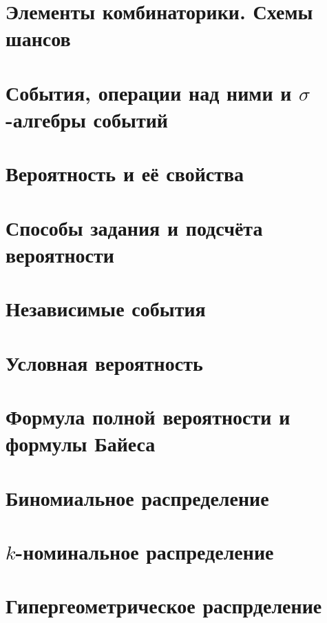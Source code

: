\section{Элементы комбинаторики. Схемы шансов} %


\section{События, операции над ними и $\sigma$-алгебры событий} %


\section{Вероятность и её свойства} %


\section{Способы задания и подсчёта вероятности} %
% 

\section{Независимые события} %
% 

\section{Условная вероятность} %
% 

\section{Формула полной вероятности и формулы Байеса} %
% 

\section{Биномиальное распределение} %


\section{$k$-номинальное распределение}

\section{Гипергеометрическое распрделение}



